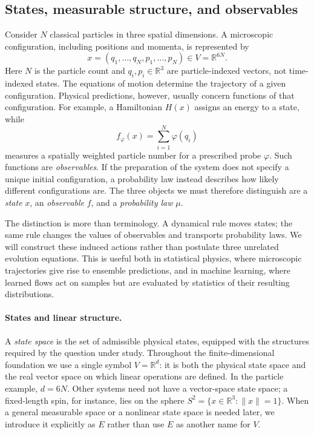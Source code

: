 \documentclass[12pt,a4paper,oneside]{book}
\begin{document}
\subsection{States, measurable structure, and observables}
Consider $N$ classical particles in three spatial dimensions. A microscopic configuration, including positions and momenta,
is represented by
\begin{equation*}
    x=(q_1,\ldots,q_N,p_1,\ldots,p_N)\in V=\mathbb R^{6N}.
\end{equation*}
Here $N$ is the particle count and $q_i,p_i\in\mathbb R^3$ are particle-indexed vectors, not time-indexed states.
The equations of motion determine the trajectory of a given configuration. Physical predictions, however, usually concern
functions of that configuration. For example, a Hamiltonian $H(x)$ assigns an energy to a state, while
\begin{equation*}
    f_\varphi(x)=\sum_{i=1}^N\varphi(q_i)
\end{equation*}
measures a spatially weighted particle number for a prescribed probe $\varphi$. Such functions are \emph{observables}. If
the preparation of the system does not specify a unique initial configuration, a probability law instead describes how likely
different configurations are. The three objects we must therefore distinguish are a \emph{state} $x$, an \emph{observable}
$f$, and a \emph{probability law} $\mu$.

The distinction is more than terminology. A dynamical rule moves states; the same rule changes the values of observables
and transports probability laws. We will construct these induced actions rather than postulate three unrelated evolution
equations. This is useful both in statistical physics, where microscopic trajectories give rise to ensemble predictions,
and in machine learning, where learned flows act on samples but are evaluated by statistics of their resulting distributions.

\paragraph{States and linear structure.}
A \emph{state space} is the set of admissible physical states, equipped with the structures required by the question under
study. Throughout the finite-dimensional foundation we use a single symbol $V=\mathbb R^d$: it is both the physical state
space and the real vector space on which linear operations are defined. In the particle example, $d=6N$. Other systems need
not have a vector-space state space; a fixed-length spin, for instance, lies on the sphere $S^2=\{x\in\mathbb R^3:\|x\|=1\}$.
When a general measurable space or a nonlinear state space is needed later, we introduce it explicitly as $E$ rather than
use $E$ as another name for $V$.
\end{document}
